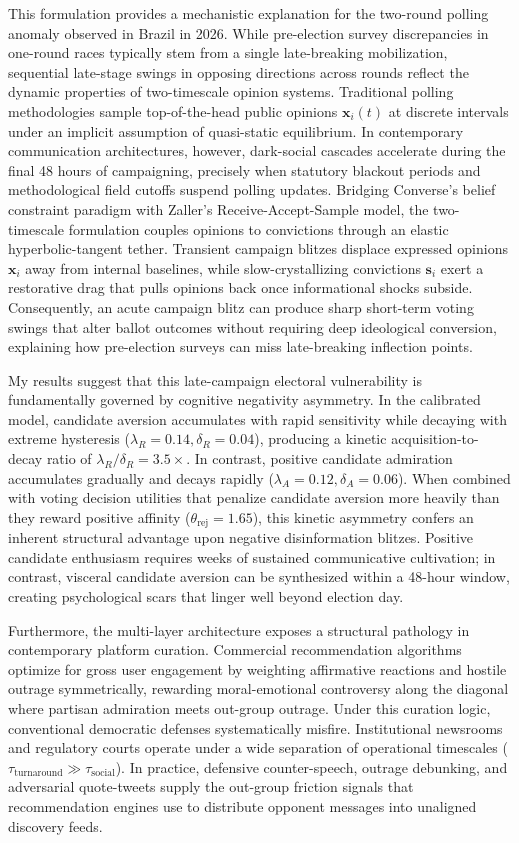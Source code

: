 \documentclass[a4paper,fleqn]{cas-dc}
\begin{document}
This formulation provides a mechanistic explanation for the two-round polling anomaly observed in Brazil in 2026. While pre-election survey discrepancies in one-round races typically stem from a single late-breaking mobilization, sequential late-stage swings in opposing directions across rounds reflect the dynamic properties of two-timescale opinion systems. Traditional polling methodologies sample top-of-the-head public opinions $\mathbf{x}_i(t)$ at discrete intervals under an implicit assumption of quasi-static equilibrium. In contemporary communication architectures, however, dark-social cascades accelerate during the final 48 hours of campaigning, precisely when statutory blackout periods and methodological field cutoffs suspend polling updates. Bridging Converse's belief constraint paradigm with Zaller's Receive-Accept-Sample model, the two-timescale formulation couples opinions to convictions through an elastic hyperbolic-tangent tether. Transient campaign blitzes displace expressed opinions $\mathbf{x}_i$ away from internal baselines, while slow-crystallizing convictions $\mathbf{s}_i$ exert a restorative drag that pulls opinions back once informational shocks subside. Consequently, an acute campaign blitz can produce sharp short-term voting swings that alter ballot outcomes without requiring deep ideological conversion, explaining how pre-election surveys can miss late-breaking inflection points.

My results suggest that this late-campaign electoral vulnerability is fundamentally governed by cognitive negativity asymmetry. In the calibrated model, candidate aversion accumulates with rapid sensitivity while decaying with extreme hysteresis ($\lambda_R = 0.14, \delta_R = 0.04$), producing a kinetic acquisition-to-decay ratio of $\lambda_R / \delta_R = 3.5\times$. In contrast, positive candidate admiration accumulates gradually and decays rapidly ($\lambda_A = 0.12, \delta_A = 0.06$). When combined with voting decision utilities that penalize candidate aversion more heavily than they reward positive affinity ($\theta_{\mathrm{rej}} = 1.65$), this kinetic asymmetry confers an inherent structural advantage upon negative disinformation blitzes. Positive candidate enthusiasm requires weeks of sustained communicative cultivation; in contrast, visceral candidate aversion can be synthesized within a 48-hour window, creating psychological scars that linger well beyond election day.

Furthermore, the multi-layer architecture exposes a structural pathology in contemporary platform curation. Commercial recommendation algorithms optimize for gross user engagement by weighting affirmative reactions and hostile outrage symmetrically, rewarding moral-emotional controversy along the diagonal where partisan admiration meets out-group outrage. Under this curation logic, conventional democratic defenses systematically misfire. Institutional newsrooms and regulatory courts operate under a wide separation of operational timescales ($\tau_{\mathrm{turnaround}} \gg \tau_{\mathrm{social}}$). In practice, defensive counter-speech, outrage debunking, and adversarial quote-tweets supply the out-group friction signals that recommendation engines use to distribute opponent messages into unaligned discovery feeds.
\end{document}
